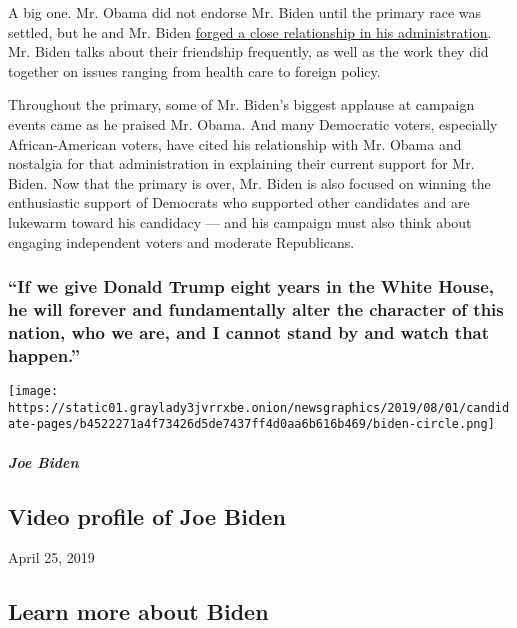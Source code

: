 A big one. Mr. Obama did not endorse Mr. Biden until the primary race
was settled, but he and Mr. Biden
\href{https://www.nytimes3xbfgragh.onion/2019/08/16/us/politics/biden-obama-history.html}{forged
a close relationship in his administration}. Mr. Biden talks about their
friendship frequently, as well as the work they did together on issues
ranging from health care to foreign policy.

Throughout the primary, some of Mr. Biden's biggest applause at campaign
events came as he praised Mr. Obama. And many Democratic voters,
especially African-American voters, have cited his relationship with Mr.
Obama and nostalgia for that administration in explaining their current
support for Mr. Biden. Now that the primary is over, Mr. Biden is also
focused on winning the enthusiastic support of Democrats who supported
other candidates and are lukewarm toward his candidacy --- and his
campaign must also think about engaging independent voters and moderate
Republicans.

\hypertarget{if-we-give-donald-trump-eight-years-in-the-white-house-he-will-forever-and-fundamentally-alter-the-character-of-this-nation-who-we-are-and-i-cannot-stand-by-and-watch-that-happen}{%
\subsubsection{``If we give Donald Trump eight years in the White House,
he will forever and fundamentally alter the character of this nation,
who we are, and I cannot stand by and watch that
happen.''}\label{if-we-give-donald-trump-eight-years-in-the-white-house-he-will-forever-and-fundamentally-alter-the-character-of-this-nation-who-we-are-and-i-cannot-stand-by-and-watch-that-happen}}

\texttt{[image: https://static01.graylady3jvrrxbe.onion/newsgraphics/2019/08/01/candidate-pages/b4522271a4f73426d5de7437ff4d0aa6b616b469/biden-circle.png]}

\hypertarget{joe-biden-1}{%
\subparagraph{Joe Biden}\label{joe-biden-1}}

\hypertarget{video-profile-of-joe-biden}{%
\subsection{Video profile of Joe
Biden}\label{video-profile-of-joe-biden}}

April 25, 2019

\hypertarget{learn-more-about-biden}{%
\subsection{Learn more about Biden}\label{learn-more-about-biden}}

